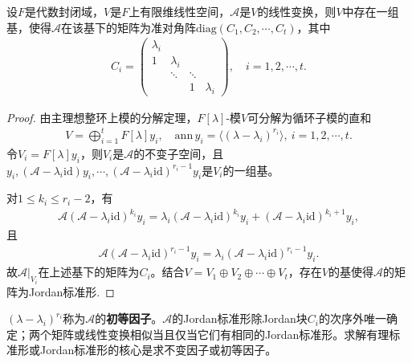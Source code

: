 \documentclass[../../main.tex]{subfiles}%
\begin{document}
\begin{theorem}
设$F$是代数封闭域，$V$是$F$上有限维线性空间，$\mathscr{A}$是$V$的线性变换，则$V$中存在一组基，使得$\mathscr{A}$在该基下的矩阵为准对角阵$\mathrm{diag}(C_1,C_2,\cdots,C_t)$，其中
\begin{align*}
C_i=
\begin{pmatrix}
\lambda_i&&&\\
1&\lambda_i&&\\
&\ddots&\ddots&\\
&&1&\lambda_i
\end{pmatrix},\quad i=1,2,\cdots,t.
\end{align*}
\end{theorem}
\begin{proof}
由主理想整环上模的分解定理，$F[\lambda]$-模$V$可分解为循环子模的直和
\begin{align*}
V=\bigoplus_{i=1}^t F[\lambda]y_i,\quad \mathrm{ann}\,y_i=\langle(\lambda-\lambda_i)^{r_i}\rangle,\ i=1,2,\cdots,t.
\end{align*}
令$V_i=F[\lambda]y_i$，则$V_i$是$\mathscr{A}$的不变子空间，且$y_i,(\mathscr{A}-\lambda_i\mathrm{id})y_i,\cdots,(\mathscr{A}-\lambda_i\mathrm{id})^{r_i-1}y_i$是$V_i$的一组基。

对$1\leqslant k_i\leqslant r_i-2$，有
\begin{align*}
\mathscr{A}(\mathscr{A}-\lambda_i\mathrm{id})^{k_i}y_i=\lambda_i(\mathscr{A}-\lambda_i\mathrm{id})^{k_i}y_i+(\mathscr{A}-\lambda_i\mathrm{id})^{k_i+1}y_i,
\end{align*}
且
\begin{align*}
\mathscr{A}(\mathscr{A}-\lambda_i\mathrm{id})^{r_i-1}y_i=\lambda_i(\mathscr{A}-\lambda_i\mathrm{id})^{r_i-1}y_i.
\end{align*}
故$\mathscr{A}|_{V_i}$在上述基下的矩阵为$C_i$。结合$V=V_1\oplus V_2\oplus\cdots\oplus V_t$，存在$V$的基使得$\mathscr{A}$的矩阵为Jordan标准形.
\end{proof}
\begin{remark}
$(\lambda-\lambda_i)^{r_i}$称为$\mathscr{A}$的\textbf{初等因子}。$\mathscr{A}$的Jordan标准形除Jordan块$C_i$的次序外唯一确定；两个矩阵或线性变换相似当且仅当它们有相同的Jordan标准形。求解有理标准形或Jordan标准形的核心是求不变因子或初等因子。
\end{remark}
\end{document}
